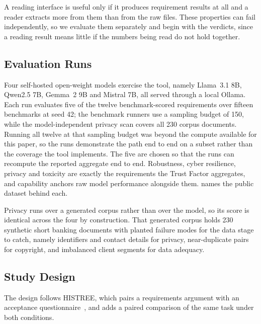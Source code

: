 \documentclass[10pt,conference]{IEEEtran}
\begin{document}
A reading interface is useful only if it produces requirement results at all and a reader extracts more from them than from the raw files.
These properties can fail independently, so we evaluate them separately and begin with the verdicts, since a reading result means little if the numbers being read do not hold together.

\subsection{Evaluation Runs}
\label{sec:panels}
Four self-hosted open-weight models exercise the tool, namely Llama~3.1 8B, Qwen2.5 7B, Gemma~2 9B and Mistral 7B, all served through a local Ollama.
Each run evaluates five of the twelve benchmark-scored requirements over fifteen benchmarks at seed 42; the benchmark runners use a sampling budget of 150, while the model-independent privacy scan covers all 230 corpus documents.
Running all twelve at that sampling budget was beyond the compute available for this paper, so the runs demonstrate the path end to end on a subset rather than the coverage the tool implements.
The five are chosen so that the runs can recompute the reported aggregate end to end.
Robustness, cyber resilience, privacy and toxicity are exactly the requirements the Trust Factor aggregates, and capability anchors raw model performance alongside them.
 names the public dataset behind each.

Privacy runs over a generated corpus rather than over the model, so its score is identical across the four by construction.
That generated corpus holds 230 synthetic short banking documents with planted failure modes for the data stage to catch, namely identifiers and contact details for privacy, near-duplicate pairs for copyright, and imbalanced client segments for data adequacy.

\subsection{Study Design}
The design follows HISTREE, which pairs a requirements argument with an acceptance questionnaire~\cite{studtmann2023histree,davis1989tam}, and adds a paired comparison of the same task under both conditions.
\end{document}
